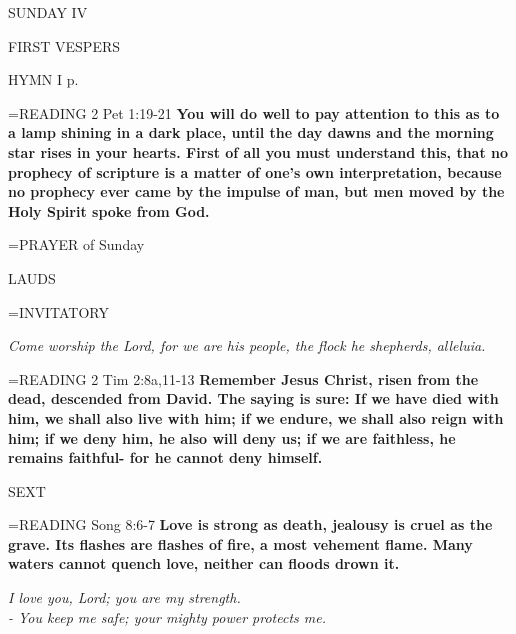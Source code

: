 \begin{center}\normalsize SUNDAY IV\\
\end{center}

\begin{flushleft}\normalsize FIRST VESPERS\\\end{flushleft}

HYMN I p. \pageref{ordinaryTime:firstHymn}

\hangindent=\parindent \small{READING} 2 Pet 1:19-21 \textbf{You will do well to pay attention to this as to a lamp shining in a dark place, until the day dawns and the morning star rises in your hearts. First of all you must understand this, that no prophecy of scripture is a matter of one’s own interpretation, because no prophecy ever came by the impulse of man, but men moved by the Holy Spirit spoke from God.\\}

\hangindent=\parindent \small{PRAYER  of Sunday}

\begin{flushleft}\normalsize LAUDS\\\end{flushleft}

\hangindent=\parindent \small{INVITATORY}
\begin{center}
\textit{Come worship the Lord, for we are his people, the flock he shepherds, alleluia.\\}
\end{center}

\hangindent=\parindent \small{READING} 2 Tim 2:8a,11-13 \textbf{Remember Jesus Christ, risen from the dead, descended from David. The saying is sure: If we have died with him, we shall also live with him; if we endure, we shall also reign with him; if we deny him, he also will deny us; if we are faithless, he remains faithful- for he cannot deny himself.\\}

\begin{flushleft}\normalsize SEXT\\\end{flushleft}

\hangindent=\parindent \small{READING} Song 8:6-7 \textbf{Love is strong as death, jealousy is cruel as the grave. Its flashes are flashes of fire, a most vehement flame. Many waters cannot quench love, neither can floods drown it.}

\begin{center}
\textit{I love you, Lord; you are my strength.\\
- You keep me safe; your mighty power protects me.}
\end{center}

